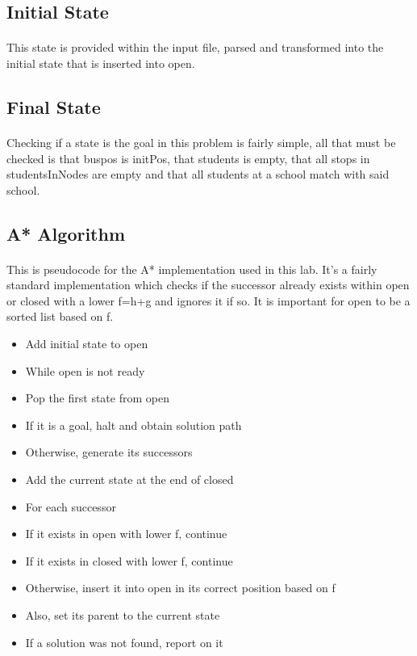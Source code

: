 \subsection{Initial State}
\paragraph{}
This state is provided within the input file, parsed and transformed into the initial state that is inserted into open.

\subsection{Final State}
\paragraph{}
Checking if a state is the goal in this problem is fairly simple, all that must be checked is that buspos is initPos, that students is empty, that all stops in studentsInNodes are empty and that all students at a school match with said school.

\subsection{A* Algorithm}
\paragraph{}
This is pseudocode for the A* implementation used in this lab. It’s a fairly standard implementation which checks if the successor already exists within open or closed with a lower f=h+g and ignores it if so. It is important for open to be a sorted list based on f.

\begin{itemize}
    \item[] Add initial state to open
    \item[] While open is not ready
    \item[] \quad Pop the first state from open
    \item[] \quad If it is a goal, halt and obtain solution path
    \item[] \quad Otherwise, generate its successors
    \item[] \quad Add the current state at the end of closed
    \item[] \quad For each successor
    \item[] \quad \quad If it exists in open with lower f, continue
    \item[] \quad \quad If it exists in closed with lower f, continue
    \item[] \quad \quad Otherwise, insert it into open in its correct position based on f
    \item[] \quad \quad Also, set its parent to the current state
    \item[] If a solution was not found, report on it
\end{itemize}

